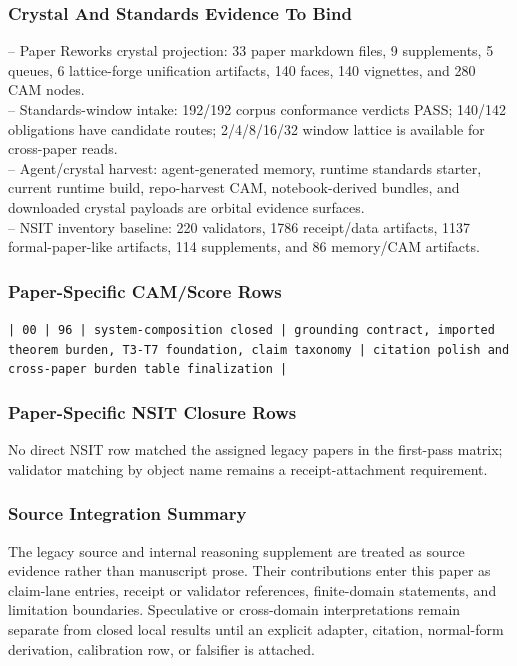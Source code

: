 \documentclass[11pt]{article}
\begin{document}
\subsubsection*{Crystal And Standards Evidence To Bind}

\noindent{}-- Paper Reworks crystal projection: 33 paper markdown files, 9 supplements, 5 queues, 6 lattice-forge unification artifacts, 140 faces, 140 vignettes, and 280 CAM nodes.\\
\noindent{}-- Standards-window intake: 192/192 corpus conformance verdicts PASS; 140/142 obligations have candidate routes; 2/4/8/16/32 window lattice is available for cross-paper reads.\\
\noindent{}-- Agent/crystal harvest: agent-generated memory, runtime standards starter, current runtime build, repo-harvest CAM, notebook-derived bundles, and downloaded crystal payloads are orbital evidence surfaces.\\
\noindent{}-- NSIT inventory baseline: 220 validators, 1786 receipt/data artifacts, 1137 formal-paper-like artifacts, 114 supplements, and 86 memory/CAM artifacts.\\

\subsubsection*{Paper-Specific CAM/Score Rows}

\noindent\texttt{| 00 | 96 | system-composition closed | grounding contract, imported theorem burden, T3-T7 foundation, claim taxonomy | citation polish and cross-paper burden table finalization |}\\

\subsubsection*{Paper-Specific NSIT Closure Rows}

No direct NSIT row matched the assigned legacy papers in the first-pass matrix; validator matching by object name remains a receipt-attachment requirement.

\subsubsection*{Source Integration Summary}

The legacy source and internal reasoning supplement are treated as source
evidence rather than manuscript prose. Their contributions enter this paper as
claim-lane entries, receipt or validator references, finite-domain statements,
and limitation boundaries. Speculative or cross-domain interpretations remain
separate from closed local results until an explicit adapter, citation,
normal-form derivation, calibration row, or falsifier is attached.
\end{document}
